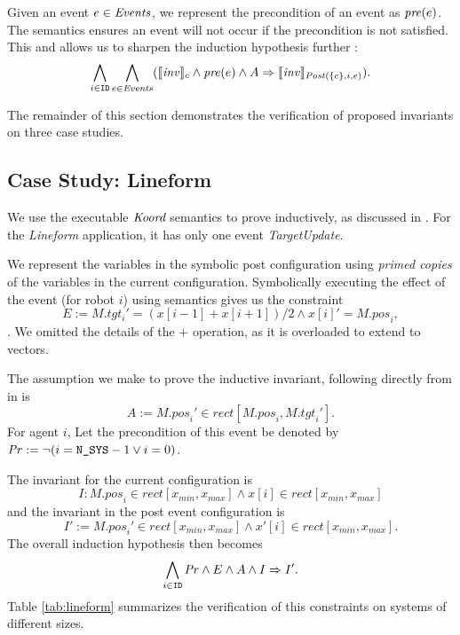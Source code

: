 Given an event $e\in \mathit{Events}$, we represent the precondition of an event as $\mathit{pre}(e)$. The semantics ensures an event will not occur if the precondition is not satisfied. This and  allows us to sharpen the induction hypothesis further :
    $$ \bigwedge_{i\in \texttt{ID}} \bigwedge_{e \in \mathit{Events}}  (\llbracket\mathit{inv}\rrbracket_{c} \wedge \mathit{pre}(e) \wedge A \Rightarrow \llbracket\mathit{inv}\rrbracket_{\mathit{Post}(\left\{c\right\}, i, e) }).$$


The remainder of this section demonstrates the verification of proposed invariants on three case studies.


\subsection{Case Study: Lineform}
 We use the executable $\emph{Koord}$ semantics to prove  inductively, as discussed in . For the \emph{Lineform} application, it has only one event \emph{TargetUpdate}.

We represent the variables in the symbolic post configuration using \emph{primed copies} of the variables in the current configuration. Symbolically executing the effect of the event (for robot $i$) using \K semantics gives us the constraint $$E := \mathit{M.tgt_i}' = (x[i-1] + x[i+1])/2 \wedge x[i]' = \mathit{M.pos}_i,$$. We omitted the details of the $+$ operation, as it is overloaded to extend to vectors.

The assumption we make to prove the inductive invariant, following directly from  in  is $$A := \mathit{M.pos}_i' \in \mathit{rect}[\mathit{M.pos}_i,\mathit{M.tgt}_i'] .$$
For agent $i$, Let the precondition of this event be denoted by $\mathit{Pr}:= \neg (i = \texttt{N\_SYS} - 1 \vee i = 0)$.


The invariant for the current configuration is $$I: \mathit{M.pos}_i \in \mathit{rect}[x_{min}, x_{max}] \wedge x[i] \in \mathit{rect}[x_{min}, x_{max}]$$ and the invariant in the post event configuration is $$I' := \mathit{M.pos}_i' \in \mathit{rect}[x_{min}, x_{max}] \wedge x'[i] \in \mathit{rect}[x_{min}, x_{max}].$$
The overall induction hypothesis then becomes $$ \bigwedge_{i\in \texttt{ID}}\mathit{Pr} \wedge E \wedge A \wedge  I \Rightarrow I'.$$
Table \ref{tab:lineform} summarizes the verification of this constraints on systems of different sizes.

